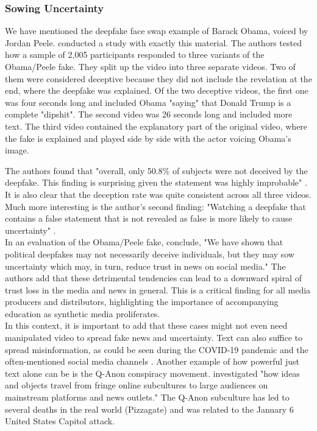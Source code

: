 \documentclass[
  a4paper,  %
  twoside,  %
  bibliography=totoc,
  headsepline,
  cleardoublepage=empty,
  parskip=half,
  draft=false
]{scrbook}
\begin{document}
\subsubsection*{Sowing Uncertainty}
We have mentioned the deepfake face swap example of Barack Obama, voiced by Jordan Peele. \citeauthor{vaccariDeepfakesDisinformationExploring2020} conducted a study with exactly this material. The authors tested how a sample of 2,005 participants responded to three variants of the Obama/Peele fake. They split up the video into three separate videos. Two of them were considered deceptive because they did not include the revelation at the end, where the deepfake was explained. Of the two deceptive videos, the first one was four seconds long and included Obama "saying" that Donald Trump is a complete "dipshit". The second video was 26 seconds long and included more text. The third video contained the explanatory part of the original video, where the fake is explained and played side by side with the actor voicing Obama's image. 

The authors found that "overall, only 50.8\% of subjects were not deceived by the deepfake. This finding is surprising given the statement was highly improbable" \cite[p. 6]{vaccariDeepfakesDisinformationExploring2020}. 
It is also clear that the deception rate was quite consistent across all three videos. Much more interesting is the author's second finding: "Watching a deepfake that contains a false statement that is not revealed as false is more likely to cause uncertainty" \cite[p. 7]{vaccariDeepfakesDisinformationExploring2020}. \\
In an evaluation of the Obama/Peele fake, \citet[p. 9]{vaccariDeepfakesDisinformationExploring2020} conclude, "We have shown that political deepfakes may not necessarily deceive individuals, but they may sow uncertainty which may, in turn, reduce trust in news on social media." The authors add that these detrimental tendencies can lead to a downward spiral of trust loss in the media and news in general. This is a critical finding for all media producers and distributors, highlighting the importance of accompanying education as synthetic media proliferates. \\
In this context, it is important to add that these cases might not even need manipulated video to spread fake news and uncertainty. Text can also suffice to spread misinformation, as could be seen during the COVID-19 pandemic and the often-mentioned social media channels \cite{naeemExplorationHowFake2021}. Another example of how powerful just text alone can be is the Q-Anon conspiracy movement. \citet[p. 1]{zeeuwTracingNormieficationCrossplatform2020} investigated "how ideas and objects travel from fringe online subcultures to large audiences on mainstream platforms and news outlets." The Q-Anon subculture has led to several deaths in the real world (Pizzagate) and was related to the January 6 United States Capitol attack.
\end{document}
